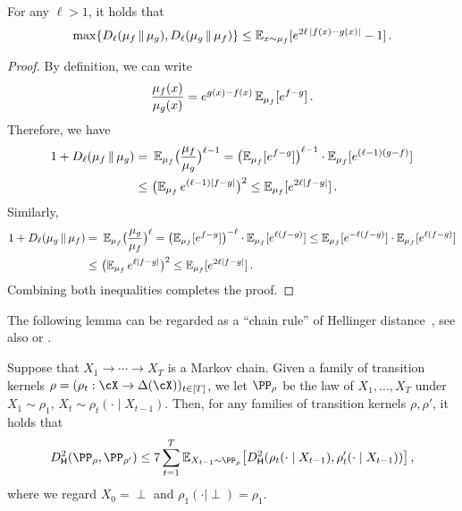 \begin{lemma}\label{lem:Renyi-to-diff}
For any $\ell>1$, it holds that
\begin{align}
    \max\crl{ \Dren[\ell]{\mu_f}{\mu_g}, \Dren[\ell]{\mu_g}{\mu_f} }
    \leq \En_{x\sim \mu_f}\brk{e^{2\ell\,\abs{f(x)-g(x)}}-1}\,.
\end{align}
\end{lemma}
\begin{proof}
By definition, we can write
\begin{align*}
    \frac{\mu_f(x)}{\mu_g(x)}=e^{g(x)-f(x)}\operatorname{\mathbb{E}}_{\mu_f}[e^{f-g}]\,.
\end{align*}
Therefore, we have
\begin{align*}
    1+\Dren[\ell]{\mu_f}{\mu_g}=&~\En_{\mu_f}\prn[\big]{\frac{\mu_f}{\mu_g}}^{\ell-1}
    = \prn*{\En_{\mu_f}[e^{f-g}]}^{\ell-1}\cdot \En_{\mu_f}[e^{(\ell-1)(g-f)}] \\
    \leq&~ \prn[\big]{\En_{\mu_f}e^{(\ell-1)\abs{f-g}}}^2
    \leq \En_{\mu_f}[e^{2\ell\abs{f-g}}]\,.
\end{align*}
Similarly,
\begin{align*}
    1+\Dren[\ell]{\mu_g}{\mu_f}=&~\En_{\mu_f}\prn[\big]{\frac{\mu_g}{\mu_f}}^{\ell}= \prn*{\En_{\mu_f}[e^{f-g}]}^{-\ell}\cdot \En_{\mu_f}[e^{\ell(f-g)}] 
    \leq \En_{\mu_f}[e^{-\ell(f-g)}]\cdot \En_{\mu_f}[e^{\ell(f-g)}]\\
    \leq&~ \prn[\big]{\En_{\mu_f}e^{\ell\abs{f-g}}}^2
    \leq \En_{\mu_f}[e^{2\ell\abs{f-g}}]\,.
\end{align*}
Combining both inequalities completes the proof.
\end{proof}

The following lemma can be regarded as a ``chain rule'' of Hellinger distance~\citep{jayram2009hellinger}, see also \citet[Lemma 11.5.3]{duchi-notes} or \citet[Lemma D.2]{foster2024online}.
\begin{lemma}
\label{lem:Hellinger-chain}
Suppose that $X_1\to \cdots\to X_T$ is a Markov chain. Given a family of transition kernels $\rho=(\rho_t: \cX\to \Delta(\cX))_{t\in [T]}$, we let $\PP_\rho$ be the law of $X_1,\ldots,X_T$ under $X_1\sim \rho_1$, $X_t\sim\rho_t(\cdot\mid X_{t-1})$. Then, for any families of transition kernels $\rho, \rho'$, it holds that
\begin{align*}
  \Dhels{\PP_\rho}{\PP_{\rho'}}\leq 
7\sum_{t=1}^{T} \En_{X_{t-1}\sim \PP_{\rho}}\brk*{\Dhels{\rho_t(\cdot\mid X_{t-1})}{\rho'_t(\cdot\mid X_{t-1})}}\,,
\end{align*}
where we regard $X_0= {\perp}$ and $\rho_1(\cdot\mid \perp)=\rho_1$.
\end{lemma}














